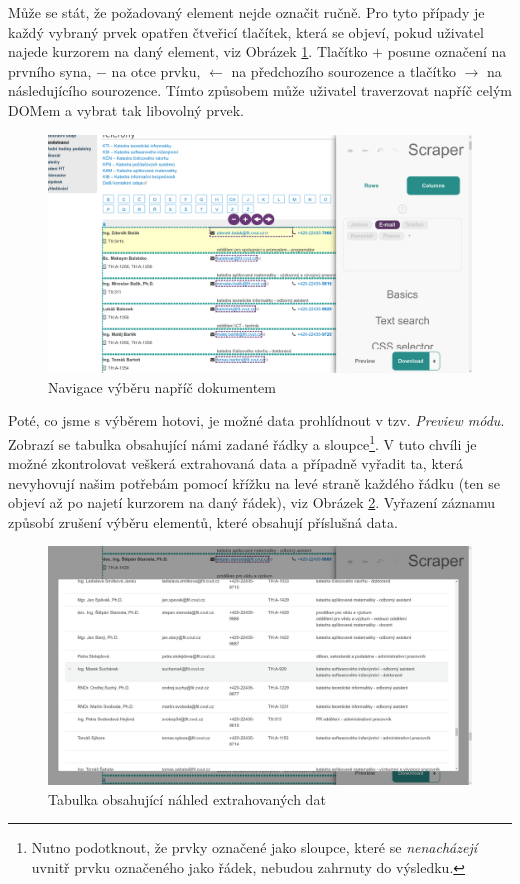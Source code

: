 \documentclass[thesis=B,czech]{FITthesis}[2012/06/26]
\begin{document}
Může se stát, že požadovaný element nejde označit ručně. Pro tyto případy je každý vybraný prvek opatřen čtveřicí tlačítek, která se objeví, pokud uživatel najede kurzorem na daný element, viz Obrázek \ref{fig:scraper_dom_navigation}. Tlačítko \textsf{$+$} posune označení na prvního syna, \textsf{$-$} na otce prvku, \textsf{$\leftarrow$} na předchozího sourozence a tlačítko \textsf{$\rightarrow$} na následujícího sourozence. Tímto způsobem může uživatel traverzovat napříč celým DOMem a vybrat tak libovolný prvek.
\begin{figure}[h]
	\includegraphics[width=\linewidth]{images/Scraper_dom_navigation.png}
	\caption{Navigace výběru napříč dokumentem}
	\label{fig:scraper_dom_navigation}
\end{figure}

Poté, co jsme s výběrem hotovi, je možné data prohlídnout v tzv. \textit{Preview módu}. Zobrazí se tabulka obsahující námi zadané řádky a sloupce\footnote{Nutno podotknout, že prvky označené jako sloupce, které se \emph{nenacházejí} uvnitř prvku označeného jako řádek, nebudou zahrnuty do výsledku.}. V tuto chvíli je možné zkontrolovat veškerá extrahovaná data a případně vyřadit ta, která nevyhovují našim potřebám pomocí křížku na levé straně každého řádku (ten se objeví až po najetí kurzorem na daný řádek), viz Obrázek \ref{fig:scraper_preview_mode}. Vyřazení záznamu způsobí zrušení výběru elementů, které obsahují příslušná data.
\begin{figure}[h]
	\includegraphics[width=\linewidth]{images/Scraper_preview_mode.png}
	\caption{Tabulka obsahující náhled extrahovaných dat}
	\label{fig:scraper_preview_mode}
\end{figure}
\end{document}
